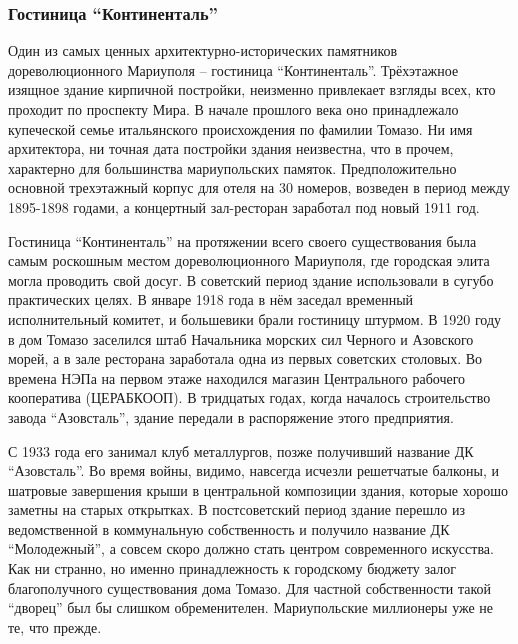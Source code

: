  
 
 
 
 

\subsubsection{Гостиница \enquote{Континенталь}}

Один из самых ценных архитектурно-исторических памятников дореволюционного
Мариуполя – гостиница \enquote{Континенталь}. Трёхэтажное изящное здание кирпичной
постройки, неизменно привлекает взгляды всех, кто проходит по проспекту Мира. В
начале прошлого века оно принадлежало купеческой семье итальянского
происхождения по фамилии Томазо. Ни имя архитектора, ни точная дата постройки
здания неизвестна, что в прочем, характерно для большинства мариупольских
памяток. Предположительно основной трехэтажный корпус для отеля на 30 номеров,
возведен в период между 1895-1898 годами, а концертный зал-ресторан заработал
под новый 1911 год.


Гостиница \enquote{Континенталь} на протяжении всего своего существования была самым
роскошным местом дореволюционного Мариуполя, где городская элита могла
проводить свой досуг. В советский период здание использовали в сугубо
практических целях. В январе 1918 года в нём заседал временный исполнительный
комитет, и большевики брали гостиницу штурмом. В 1920 году в дом Томазо
заселился штаб Начальника морских сил Черного и Азовского морей, а в зале
ресторана заработала одна из первых советских столовых. Во времена НЭПа на
первом этаже находился магазин Центрального рабочего кооператива (ЦЕРАБКООП). В
тридцатых годах, когда началось строительство завода \enquote{Азовсталь}, здание
передали в распоряжение этого предприятия.


С 1933 года его занимал клуб металлургов, позже получивший название ДК
\enquote{Азовсталь}. Во время войны, видимо, навсегда исчезли решетчатые балконы, и
шатровые завершения крыши в центральной композиции здания, которые хорошо
заметны на старых открытках. В постсоветский период здание перешло из
ведомственной в коммунальную собственность и получило название ДК \enquote{Молодежный},
а совсем скоро должно стать центром современного искусства. Как ни странно, но
именно принадлежность к городскому бюджету залог благополучного существования
дома Томазо. Для частной собственности такой \enquote{дворец} был бы слишком
обременителен. Мариупольские миллионеры уже не те, что прежде.


